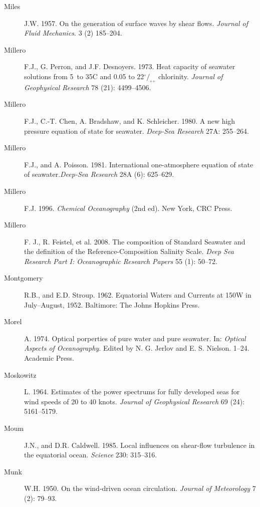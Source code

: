 \begin{description}
\item [Miles]J.W. 1957. On the generation of surface waves by shear
  flows.  \textit{Journal of Fluid Mechanics}. 3 (2) 185--204.

\item [Millero]F.J., G. Perron, and J.F. Desnoyers. 1973. Heat
  capacity of seawater solutions from 5\degrees\ to 35\degrees C and
  0.05 to 22$^\circ/_{\circ\circ}$ chlorinity. \textit{Journal of
    Geophysical Research} 78 (21): 4499--4506.

\item[Millero]F.J., C.-T. Chen, A. Bradshaw, and
  K. Schleicher. 1980. A new high pressure equation of state for
  seawater. \textit{Deep-Sea Research} 27A: 255--264.

\item [Millero]F.J., and A. Poisson. 1981. International
  one-atmosphere equation of state of seawater.\textit{Deep-Sea
    Research} 28A (6): 625--629.

\item [Millero]F.J. 1996. \textit{Chemical Oceanography} (2nd ed). New
  York, CRC Press.

\item [Millero]F. J., R. Feistel, et al. 2008. The composition of
  Standard Seawater and the definition of the Reference-Composition
  Salinity Scale. \textit{Deep Sea Research Part I: Oceanographic
    Research Papers} 55 (1): 50--72.

\item [Montgomery]R.B., and E.D. Stroup. 1962. Equatorial Waters and
  Currents at 150\degrees W in July--August, 1952. Baltimore: The
  Johns Hopkins Press.

\item [Morel]A. 1974. Optical porperties of pure water and pure
  seawater. In: \textit{Optical Aspects of Ocean\-ography}. Edited by
  N. G. Jerlov and E. S.  Nielson.  1--24. Academic Press.
	
\item [Moskowitz]L. 1964. Estimates of the power spectrums for fully
  developed seas for wind speeds of 20 to 40 knots. \textit{Journal of
    Geophysical Research} 69 (24): 5161--5179.

\item [Moum]J.N., and D.R. Caldwell. 1985. Local influences on
  shear-flow turbulence in the equatorial ocean. \textit{Science} 230:
  315--316.

\item [Munk]W.H. 1950. On the wind-driven ocean
  circulation. \textit{Journal of Meteorology} 7 (2): 79--93.


\end{description}
